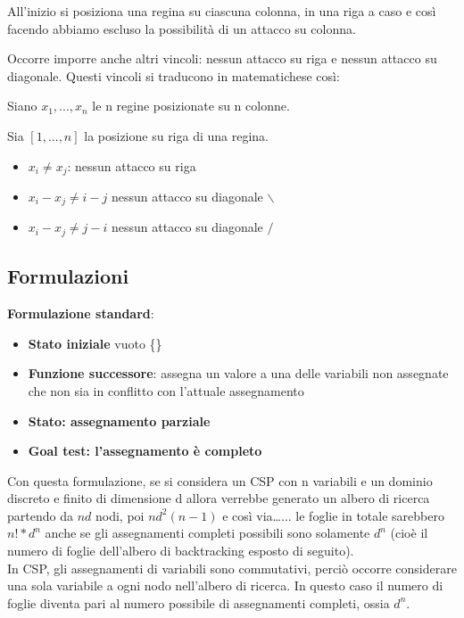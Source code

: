 All'inizio si posiziona una regina su ciascuna colonna, in una riga a caso e
così facendo abbiamo escluso la possibilità di un attacco su colonna.

Occorre imporre anche altri vincoli: nessun attacco su riga e nessun attacco su
diagonale. Questi vincoli si traducono in matematichese così:

Siano $x_1,...,x_n$ le n regine posizionate su n colonne.

Sia $[1,...,n]$ la posizione su riga di una regina.

\begin{itemize}
 \item $x_i \neq x_j$: nessun attacco su riga
 \item $x_i - x_j \neq i-j$ nessun attacco su diagonale $\backslash$
 \item $x_i - x_j \neq j-i$ nessun attacco su diagonale $/$
\end{itemize}

\subsection{Formulazioni}

\textbf{Formulazione standard}:

\begin{itemize}
 \item \textbf{Stato iniziale} vuoto \{\}
 \item \textbf{Funzione successore}: assegna un valore a una delle
variabili non assegnate che non sia in conflitto con l'attuale assegnamento
 \item \textbf{Stato: assegnamento parziale}
 \item \textbf{Goal test: l'assegnamento è completo}
\end{itemize}

Con questa formulazione, se si considera un CSP con n variabili e un dominio
discreto e finito di dimensione d allora verrebbe generato un albero di ricerca
partendo da $nd$ nodi, poi $nd^2(n-1)$ e così via\dots... le foglie in totale
sarebbero $n!*d^n$ anche se gli assegnamenti completi possibili sono solamente
$d^n$ (cioè il numero di foglie dell'albero di backtracking esposto di
seguito).\\

In CSP, gli assegnamenti di variabili sono commutativi, perciò occorre
considerare una sola variabile a ogni nodo nell'albero di ricerca.
In questo caso il numero di foglie diventa pari al numero possibile di
assegnamenti completi, ossia $d^n$.

